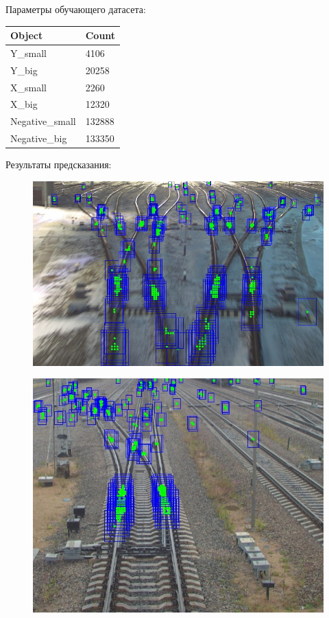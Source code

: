 Параметры обучающего датасета:
\begin{table}[!h]
	\begin{tabular}{|l|l|}
		\hline
		\textbf{Object} & \textbf{Count} \\ \hline
		Y\_small        & 4106           \\ \hline
		Y\_big          & 20258          \\ \hline
		X\_small        & 2260           \\ \hline
		X\_big          & 12320          \\ \hline
		Negative\_small & 132888         \\ \hline
		Negative\_big   & 133350         \\ \hline
	\end{tabular}
\end{table}

Результаты предсказания:
\begin{figure}[!h]
	\centering
	\includegraphics[width=0.8\linewidth]{pictures/screenshot2326}
	\caption{}
	\label{fig:screenshot2326}
\end{figure}
\begin{figure}[h!]
	\centering
	\includegraphics[width=0.8\linewidth]{pictures/screenshot2327}
	\caption{}
	\label{fig:screenshot2327}
\end{figure}\newpage
